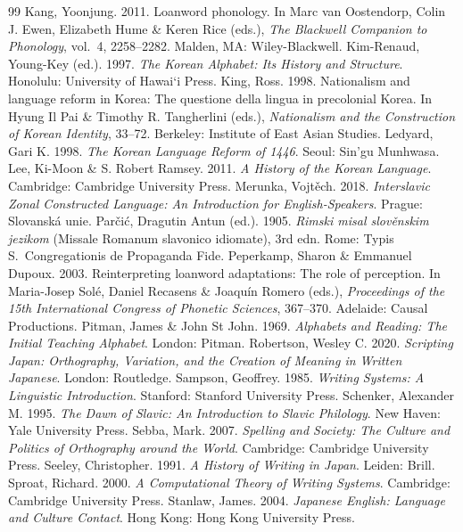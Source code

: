 \documentclass[11pt]{article}
\begin{document}
\begin{thebibliography}{99}
 Kang, Yoonjung. 2011. Loanword phonology. In Marc van Oostendorp, Colin J. Ewen, Elizabeth Hume \& Keren Rice (eds.), \emph{The Blackwell Companion to Phonology}, vol.~4, 2258--2282. Malden, MA: Wiley-Blackwell.
 Kim-Renaud, Young-Key (ed.). 1997. \emph{The Korean Alphabet: Its History and Structure}. Honolulu: University of Hawai`i Press.
 King, Ross. 1998. Nationalism and language reform in Korea: The questione della lingua in precolonial Korea. In Hyung Il Pai \& Timothy R. Tangherlini (eds.), \emph{Nationalism and the Construction of Korean Identity}, 33--72. Berkeley: Institute of East Asian Studies.
 Ledyard, Gari K. 1998. \emph{The Korean Language Reform of 1446}. Seoul: Sin'gu Munhwasa.
 Lee, Ki-Moon \& S. Robert Ramsey. 2011. \emph{A History of the Korean Language}. Cambridge: Cambridge University Press.
 Merunka, Vojt\v{e}ch. 2018. \emph{Interslavic Zonal Constructed Language: An Introduction for English-Speakers}. Prague: Slovansk\'a unie.
 Par\v{c}i\'c, Dragutin Antun (ed.). 1905. \emph{Rimski misal slov\v{e}nskim jezikom} (Missale Romanum slavonico idiomate), 3rd edn. Rome: Typis S.~Congregationis de Propaganda Fide.
 Peperkamp, Sharon \& Emmanuel Dupoux. 2003. Reinterpreting loanword adaptations: The role of perception. In Maria-Josep Sol\'e, Daniel Recasens \& Joaqu\'in Romero (eds.), \emph{Proceedings of the 15th International Congress of Phonetic Sciences}, 367--370. Adelaide: Causal Productions.
 Pitman, James \& John St John. 1969. \emph{Alphabets and Reading: The Initial Teaching Alphabet}. London: Pitman.
 Robertson, Wesley C. 2020. \emph{Scripting Japan: Orthography, Variation, and the Creation of Meaning in Written Japanese}. London: Routledge.
 Sampson, Geoffrey. 1985. \emph{Writing Systems: A Linguistic Introduction}. Stanford: Stanford University Press.
 Schenker, Alexander M. 1995. \emph{The Dawn of Slavic: An Introduction to Slavic Philology}. New Haven: Yale University Press.
 Sebba, Mark. 2007. \emph{Spelling and Society: The Culture and Politics of Orthography around the World}. Cambridge: Cambridge University Press.
 Seeley, Christopher. 1991. \emph{A History of Writing in Japan}. Leiden: Brill.
 Sproat, Richard. 2000. \emph{A Computational Theory of Writing Systems}. Cambridge: Cambridge University Press.
 Stanlaw, James. 2004. \emph{Japanese English: Language and Culture Contact}. Hong Kong: Hong Kong University Press.

\end{thebibliography}
\end{document}
